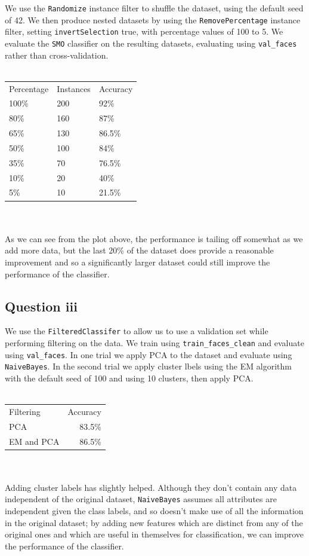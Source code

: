 \documentclass[a4paper]{article}
\begin{document}
We use the {\tt Randomize} instance filter to shuffle the dataset, using the default seed of 42. We then produce nested datasets by using the {\tt RemovePercentage} instance filter, setting {\tt invertSelection} true, with percentage values of 100 to 5. We evaluate the {\tt SMO} classifier on the resulting datasets, evaluating using {\tt val\_faces} rather than cross-validation.\\
\\
\begin{tabular}{lll}
Percentage & Instances & Accuracy\\
100\% & 200 & 92\% \\
80\% & 160 & 87\% \\
65\% & 130 & 86.5\% \\
50\% & 100 & 84\% \\
35\% & 70 & 76.5\% \\
10\% & 20 & 40\% \\
5\% & 10 & 21.5\%
\end{tabular}\\
\\
As we can see from the plot above, the performance is tailing off somewhat as we add more data, but the last 20\% of the dataset does provide a reasonable improvement and so a significantly larger dataset could still improve the performance of the classifier.

\subsection*{Question iii}
We use the {\tt FilteredClassifer} to allow us to use a validation set while performing filtering on the data. We train using {\tt train\_faces\_clean} and evaluate using {\tt val\_faces}. In one trial we apply PCA to the dataset and evaluate using {\tt NaiveBayes}. In the second trial we apply cluster lbels using the EM algorithm with the default seed of 100 and using 10 clusters, then apply PCA.\\
\\
\begin{tabular}{lr}
Filtering & Accuracy \\
PCA & 83.5\% \\
EM and PCA & 86.5\%
\end{tabular}\\
\\
Adding cluster labels has slightly helped. Although they don't contain any data independent of the original dataset, {\tt NaiveBayes} assumes all attributes are independent given the class labels, and so doesn't make use of all the information in the original dataset; by adding new features which are distinct from any of the original ones and which are useful in themselves for classification, we can improve the performance of the classifier.
\end{document}
